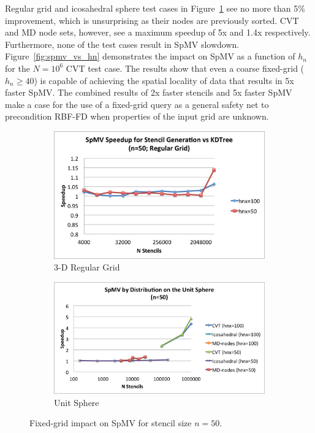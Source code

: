\documentclass{report}
\begin{document}
Regular grid and icosahedral sphere test cases in Figure~\ref{fig:spmv_impact_rg} see no more than 5\% improvement, which is unsurprising as their nodes are previously sorted. CVT and MD node sets, however, see a maximum speedup of 5x and 1.4x respectively. Furthermore, none of the test cases result in SpMV slowdown. Figure~\ref{fig:spmv_vs_hn} demonstrates the impact on SpMV as a function of $h_n$ for the $N=10^6$ CVT test case. The results show that even a coarse fixed-grid ($h_n \ge 40$) is capable of achieving the spatial locality of data that results in 5x faster SpMV. The combined results of 2x faster stencils and 5x faster SpMV make a case for the use of a fixed-grid query as a general safety net to precondition RBF-FD when properties of the input grid are unknown. 

\begin{figure}
\centering
\begin{subfigure}{9.5cm}
\includegraphics[width=\textwidth]{../figures/stencils/reg_subsets_4m_spmv_speedup.png}
\caption{3-D Regular Grid}
\end{subfigure}
\begin{subfigure}{10.5cm}
\includegraphics[width=\textwidth]{../figures/stencils/sphere_spmv_speedup.png} 
\caption{Unit Sphere}
\end{subfigure}
\caption{Fixed-grid impact on SpMV for stencil size $n=50$.}
\label{fig:spmv_impact_rg}
\end{figure}
\end{document}
